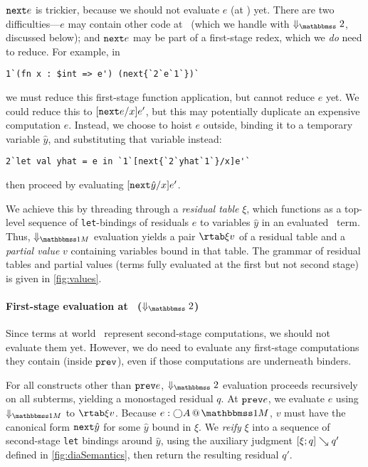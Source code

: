 \begin{abstrsyn}
${\tt next}{e}$ is trickier, because we should not evaluate $e$ (at \bbtwo) yet.
There are two difficulties---$e$ may contain other code at \bbonem\ (which we
handle with $\redtwosym$, discussed below); and ${\tt next}{e}$ may be part of a
first-stage redex, which we \emph{do} need to reduce. For example, in
\begin{lstlisting} 
1`(fn x : $int => e') (next{`2`e`1`})`
\end{lstlisting}
we must reduce this first-stage function application, but cannot reduce $e$ yet.
We could reduce this to $[{\tt next}{e}/x]e'$, but this may potentially duplicate an
expensive computation $e$. Instead, we choose to hoist $e$ outside, binding it
to a temporary variable $\hat{y}$, and substituting that variable instead:
\begin{lstlisting} 
2`let val yhat = e in `1`[next{`2`yhat`1`}/x]e'`
\end{lstlisting}
then proceed by evaluating $[{\tt next}{\hat{y}}/x]e'$.

We achieve this by threading through a \emph{residual table} $\xi$, which
functions as a top-level sequence of \texttt{let}-bindings of residuals $e$ to
variables $\hat{y}$ in an evaluated \bbonem\ term. Thus, $\redonesym$ evaluation
yields a pair $\rtab \xi v$ of a residual table and a \emph{partial value} $v$
containing variables bound in that table. The grammar of residual tables and
partial values (terms fully evaluated at the first but not second stage) is
given in \ref{fig:values}.


\paragraph{First-stage evaluation at \bbtwo\ ($\redtwosym$)}
Since terms at world \bbtwo\ represent second-stage computations, we should not
evaluate them yet. However, we do need to evaluate any first-stage computations
they contain (inside ${\tt prev}$), even if those computations are underneath
binders.

For all constructs other than ${\tt prev}{e}$, $\redtwosym$ evaluation proceeds
recursively on all subterms, yielding a monostaged residual $q$. At ${\tt prev}{e}$,
we evaluate $e$ using $\redonesym$ to $\rtab \xi v$. Because $\colmix e{\fut A}$,
$v$ must have the canonical form ${\tt next}{\hat{y}}$ for some $\hat{y}$ bound in $\xi$. We \emph{reify}
$\xi$ into a sequence of second-stage \texttt{let} bindings around $\hat{y}$,
using the auxiliary judgment $[{\xi};{q}]\searrow{q'}$ defined in
\ref{fig:diaSemantics}, then return the resulting residual $q'$.

\end{abstrsyn}

